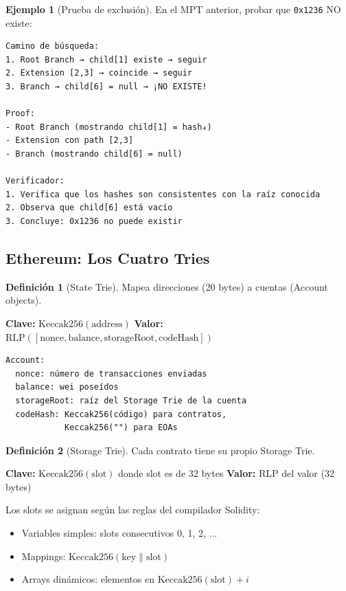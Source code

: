 \documentclass[11pt,a4paper,twoside,openright]{book}
\theoremstyle{definition}
\newtheorem{definition}{Definición}[chapter]
\newtheorem{example}{Ejemplo}[chapter]
\theoremstyle{plain}
\theoremstyle{remark}
\begin{document}
\begin{example}[Prueba de exclusión]
En el MPT anterior, probar que \texttt{0x1236} NO existe:

\begin{verbatim}
Camino de búsqueda:
1. Root Branch → child[1] existe → seguir
2. Extension [2,3] → coincide → seguir
3. Branch → child[6] = null → ¡NO EXISTE!

Proof:
- Root Branch (mostrando child[1] = hash₄)
- Extension con path [2,3]
- Branch (mostrando child[6] = null)

Verificador:
1. Verifica que los hashes son consistentes con la raíz conocida
2. Observa que child[6] está vacío
3. Concluye: 0x1236 no puede existir
\end{verbatim}
\end{example}

\subsection{Ethereum: Los Cuatro Tries}

\begin{definition}[State Trie]
Mapea direcciones (20 bytes) a cuentas (Account objects).

\textbf{Clave:} $\text{Keccak256}(\text{address})$
\textbf{Valor:} $\text{RLP}([\text{nonce}, \text{balance}, \text{storageRoot}, \text{codeHash}])$

\begin{verbatim}
Account:
  nonce: número de transacciones enviadas
  balance: wei poseídos
  storageRoot: raíz del Storage Trie de la cuenta
  codeHash: Keccak256(código) para contratos, 
            Keccak256("") para EOAs
\end{verbatim}
\end{definition}

\begin{definition}[Storage Trie]
Cada contrato tiene su propio Storage Trie.

\textbf{Clave:} $\text{Keccak256}(\text{slot})$ donde slot es de 32 bytes
\textbf{Valor:} RLP del valor (32 bytes)

Los slots se asignan según las reglas del compilador Solidity:
\begin{itemize}
    \item Variables simples: slots consecutivos 0, 1, 2, ...
    \item Mappings: $\text{Keccak256}(\text{key} \| \text{slot})$
    \item Arrays dinámicos: elementos en $\text{Keccak256}(\text{slot}) + i$
\end{itemize}
\end{definition}
\end{document}
